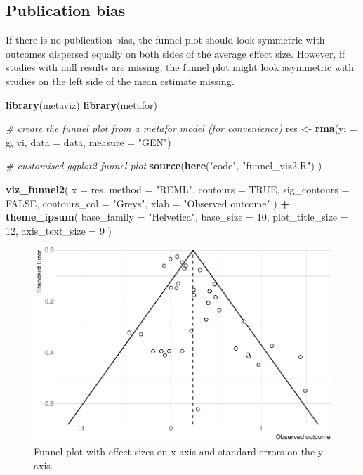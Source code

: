 \documentclass[floatsintext,doc]{apa6}
\newenvironment{Shaded}{\begin{snugshade}}{\end{snugshade}}
\newcommand{\CommentTok}[1]{\textcolor[rgb]{0.56,0.35,0.01}{\textit{#1}}}
\newcommand{\DataTypeTok}[1]{\textcolor[rgb]{0.13,0.29,0.53}{#1}}
\newcommand{\DecValTok}[1]{\textcolor[rgb]{0.00,0.00,0.81}{#1}}
\newcommand{\KeywordTok}[1]{\textcolor[rgb]{0.13,0.29,0.53}{\textbf{#1}}}
\newcommand{\NormalTok}[1]{#1}
\newcommand{\OperatorTok}[1]{\textcolor[rgb]{0.81,0.36,0.00}{\textbf{#1}}}
\newcommand{\OtherTok}[1]{\textcolor[rgb]{0.56,0.35,0.01}{#1}}
\newcommand{\StringTok}[1]{\textcolor[rgb]{0.31,0.60,0.02}{#1}}
\begin{document}
\hypertarget{publication-bias}{%
\subsection{Publication bias}\label{publication-bias}}

If there is no publication bias, the funnel plot should look symmetric with outcomes dispersed equally on both sides of the average effect size. However, if studies with null results are missing, the funnel plot might look asymmetric with studies on the left side of the mean estimate missing.

\begin{Shaded}
\begin{Highlighting}[]
\KeywordTok{library}\NormalTok{(metaviz)}
\KeywordTok{library}\NormalTok{(metafor)}

\CommentTok{# create the funnel plot from a metafor model (for convenience)}
\NormalTok{res <-}\StringTok{ }\KeywordTok{rma}\NormalTok{(}\DataTypeTok{yi =}\NormalTok{ g, vi, }\DataTypeTok{data =}\NormalTok{ data, }\DataTypeTok{measure =} \StringTok{"GEN"}\NormalTok{)}

\CommentTok{# customised ggplot2 funnel plot}
\KeywordTok{source}\NormalTok{(}\KeywordTok{here}\NormalTok{(}\StringTok{"code"}\NormalTok{, }\StringTok{"funnel_viz2.R"}\NormalTok{) )}

\KeywordTok{viz_funnel2}\NormalTok{(}
    \DataTypeTok{x =}\NormalTok{ res, }\DataTypeTok{method =} \StringTok{"REML"}\NormalTok{,}
    \DataTypeTok{contours =} \OtherTok{TRUE}\NormalTok{, }\DataTypeTok{sig_contours =} \OtherTok{FALSE}\NormalTok{,}
    \DataTypeTok{contours_col =} \StringTok{"Greys"}\NormalTok{, }\DataTypeTok{xlab =} \StringTok{"Observed outcome"}
\NormalTok{    ) }\OperatorTok{+}
\StringTok{    }\KeywordTok{theme_ipsum}\NormalTok{(}
        \DataTypeTok{base_family =} \StringTok{"Helvetica"}\NormalTok{,}
        \DataTypeTok{base_size =} \DecValTok{10}\NormalTok{, }\DataTypeTok{plot_title_size =} \DecValTok{12}\NormalTok{, }\DataTypeTok{axis_text_size =} \DecValTok{9}
\NormalTok{        )}
\end{Highlighting}
\end{Shaded}

\begin{figure}[H]

{\centering \includegraphics[width=0.75\linewidth]{supplementary_materials_files/figure-latex/funnel1-1} 

}

\caption{Funnel plot with effect sizes on x-axis and standard errors on the y-axis.}\label{fig:funnel1}
\end{figure}
\end{document}
